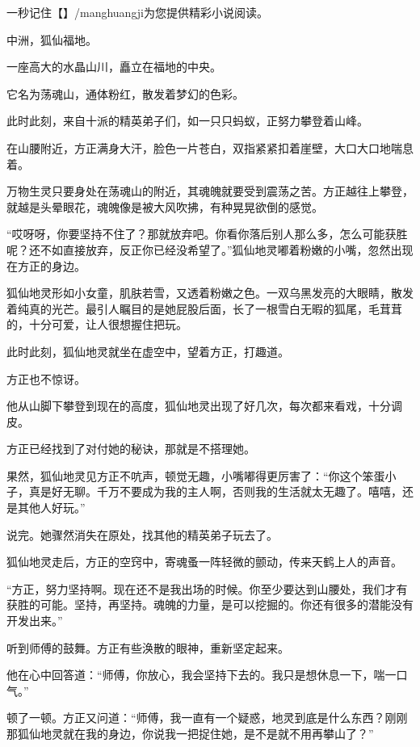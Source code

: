 
\begin{this_body}

一秒记住【】/manghuangji为您提供精彩小说阅读。

中洲，狐仙福地。

一座高大的水晶山川，矗立在福地的中央。

它名为荡魂山，通体粉红，散发着梦幻的色彩。

此时此刻，来自十派的精英弟子们，如一只只蚂蚁，正努力攀登着山峰。

在山腰附近，方正满身大汗，脸色一片苍白，双指紧紧扣着崖壁，大口大口地喘息着。

万物生灵只要身处在荡魂山的附近，其魂魄就要受到震荡之苦。方正越往上攀登，就越是头晕眼花，魂魄像是被大风吹拂，有种晃晃欲倒的感觉。

“哎呀呀，你要坚持不住了？那就放弃吧。你看你落后别人那么多，怎么可能获胜呢？还不如直接放弃，反正你已经没希望了。”狐仙地灵嘟着粉嫩的小嘴，忽然出现在方正的身边。

狐仙地灵形如小女童，肌肤若雪，又透着粉嫩之色。一双乌黑发亮的大眼睛，散发着纯真的光芒。最引人瞩目的是她屁股后面，长了一根雪白无暇的狐尾，毛茸茸的，十分可爱，让人很想握住把玩。

此时此刻，狐仙地灵就坐在虚空中，望着方正，打趣道。

方正也不惊讶。

他从山脚下攀登到现在的高度，狐仙地灵出现了好几次，每次都来看戏，十分调皮。

方正已经找到了对付她的秘诀，那就是不搭理她。

果然，狐仙地灵见方正不吭声，顿觉无趣，小嘴嘟得更厉害了：“你这个笨蛋小子，真是好无聊。千万不要成为我的主人啊，否则我的生活就太无趣了。嘻嘻，还是其他人好玩。”

说完。她骤然消失在原处，找其他的精英弟子玩去了。

狐仙地灵走后，方正的空窍中，寄魂蚤一阵轻微的颤动，传来天鹤上人的声音。

“方正，努力坚持啊。现在还不是我出场的时候。你至少要达到山腰处，我们才有获胜的可能。坚持，再坚持。魂魄的力量，是可以挖掘的。你还有很多的潜能没有开发出来。”

听到师傅的鼓舞。方正有些涣散的眼神，重新坚定起来。

他在心中回答道：“师傅，你放心，我会坚持下去的。我只是想休息一下，喘一口气。”

顿了一顿。方正又问道：“师傅，我一直有一个疑惑，地灵到底是什么东西？刚刚那狐仙地灵就在我的身边，你说我一把捉住她，是不是就不用再攀山了？”


\end{this_body}
